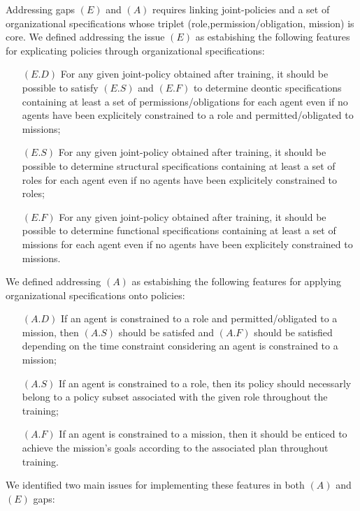 \documentclass[runningheads]{llncs}
\begin{document}
Addressing gaps $(E)$ and $(A)$ requires linking joint-policies and a set of organizational specifications whose triplet (role,permission/obligation, mission) is core. We defined addressing the issue $(E)$ as estabishing the following features for explicating policies through organizational specifications:
%
\begin{itemize}[wide, labelsep = 1em]
    \item[$(E.D)$] For any given joint-policy obtained after training, it should be possible to satisfy $(E.S)$ and $(E.F)$ to determine deontic specifications containing at least a set of permissions/obligations for each agent even if no agents have been explicitely constrained to a role and permitted/obligated to missions;
    \item[$(E.S)$] For any given joint-policy obtained after training, it should be possible to determine structural specifications containing at least a set of  roles for each agent even if no agents have been explicitely constrained to roles;
    \item[$(E.F)$] For any given joint-policy obtained after training, it should be possible to determine functional specifications containing at least a set of  missions for each agent even if no agents have been explicitely constrained to missions.
\end{itemize}

\noindent We defined addressing $(A)$ as estabishing the following features for applying organizational specifications onto policies:
%
\begin{itemize}[wide, labelsep = 1em]
    \item[$(A.D)$] If an agent is constrained to a role and permitted/obligated to a mission, then $(A.S)$ should be satisfed and $(A.F)$ should be satisfied depending on the time constraint considering an agent is constrained to a mission;
    \item[$(A.S)$] If an agent is constrained to a role, then its policy should necessarly belong to a policy subset associated with the given role throughout the training;
    \item[$(A.F)$] If an agent is constrained to a mission, then it should be enticed to achieve the mission's goals according to the associated plan throughout training.
\end{itemize}

\noindent We identified two main issues for implementing these features in both $(A)$ and $(E)$ gaps:
\end{document}
